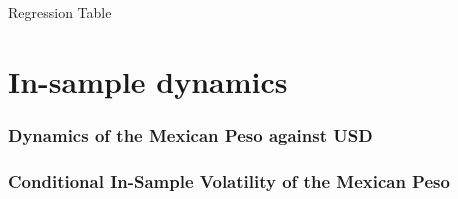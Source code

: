 \documentclass{beamer}
\begin{document}
\begin{frame}{Regression Table}
\setlength\tabcolsep{2pt}  %
\tiny  %

\normalsize
\end{frame}




\section{In-sample dynamics}
\begin{frame}
\frametitle{Dynamics of the Mexican Peso against USD}
\end{frame}


\begin{frame}
\frametitle{Conditional In-Sample Volatility of the Mexican Peso}
\end{frame}
\end{document}
